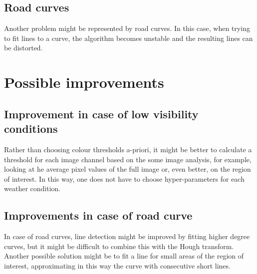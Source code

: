 \documentclass{article}
\begin{document}
\subsection{Road curves}
Another problem might be represented by road curves. In this case, when trying to fit lines to a curve, the algorithm becomes unstable and the resulting lines can be distorted.

\section{Possible improvements}
\subsection{Improvement in case of low visibility conditions}
Rather than choosing colour thresholds a-priori, it might be better to calculate a threshold for each image channel based on the some image analysis, for example, looking at he average pixel values of the full image or, even better, on the region of interest. In this way, one does not have to choose hyper-parameters for each weather condition.

\subsection{Improvements in case of road curve}
In case of road curves, line detection might be improved by fitting higher degree curves, but it might be difficult to combine this with the Hough transform. Another possible solution might be to fit a line for small areas of the region of interest, approximating in this way the curve with consecutive short lines.
\end{document}
